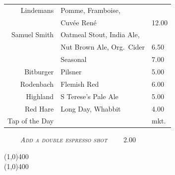 \documentclass[letterpaper, 12pt]{article}%
\newcommand{\flowtherefore}{~~\raisebox{0.2ex}{$\therefore$}~~}
\newcommand{\price}[2]{
 \textsc{\small#1}\flowtherefore
 \textsc{#2}
}
\newcommand{\varprice}[1]{
 \textsc{#1}
}
\newcommand{\heading}[1]{{\large\bfseries #1\par}}
\newcommand{\flowentry}[1]{
{\centering\heading{\LARGE\textbsi{#1}}\vspace{-2ex}

\line(1,0){400}\vspace{-3ex}\\ 
\line(1,0){400}\vspace{-2ex}

}}
\begin{document}
\begin{minipage}[t][\beerhi][b]{\beerwi}
 \scshape
 \centering
 \begin{tabular}{@{} r l l @{}}
  Lindemans     & Pomme, Framboise,                                             & \\
                & Cuv\'{e}e Ren\'{e}                                            & \varprice{12.00} \\
  Samuel Smith  & Oatmeal Stout, India Ale,                                     & \\
                & Nut Brown Ale, Org.\ Cider                                    & \varprice{6.50} \\
                & Seasonal                                                      & \varprice{7.00}\\
  Bitburger     & Pilsner                                                       & \varprice{5.00}\\
  Rodenbach     & Flemish Red                                                   & \varprice{6.00}\\
  Highland      & S\raisebox{1.7ex}{\scriptsize\underline{t}} Terese's Pale Ale & \varprice{5.00}\\
  Red Hare      & Long Day, Whabbit                                             & \varprice{4.00}\\
  Tap of the Day &                                                              & mkt.\\
 \end{tabular}
\end{minipage}

\vspace{0.5em}

{\centering
 \textbf{\textup{\normalsize{}}} \flowtherefore \price{\textrm{\emph{\normalsize Add a double espresso shot}}}{2.00}

}


\flowentry{Go\^{u}ts}

\end{document}
